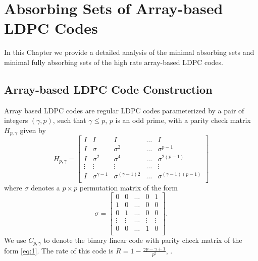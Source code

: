 \chapter[Absorbing Sets of Array-based LDPC Codes]{Absorbing Sets of Array-based LDPC
Codes}\label{arrayabs}

In this Chapter we provide a detailed analysis of the  minimal
absorbing sets and minimal fully absorbing sets of the high rate
array-based LDPC codes.


\section{Array-based LDPC Code Construction}




Array based LDPC codes \cite{fan} are regular LDPC codes
parameterized by a pair of integers $(\gamma, p)$, such that
$\gamma \leq p$, $p$ is an odd prime, with a parity check matrix
$H_{p,\gamma}$ given by
\begin{equation}\label{eq:1}
H_{p,\gamma}=\left[\begin{array}{ccccc}
I & I & I & \ldots & I\\
I & \sigma & \sigma^2 & \ldots &\sigma^{p-1}\\
I & \sigma^2 & \sigma^4 & \ldots &\sigma^{2(p-1)}\\
\vdots & \vdots & \vdots & \ldots & \vdots \\
I & \sigma^{\gamma-1} & \sigma^{(\gamma-1)2} & \ldots &\sigma^{(\gamma-1)(p-1)}\\
\end{array}
\right]
\end{equation}\normalsize
where $\sigma$ denotes a $p \times p$ permutation matrix of the
form \small
\begin{equation}
\sigma=\left[\begin{array}{ccccc}
0 & 0 & \ldots & 0 & 1\\
1 & 0 & \ldots & 0 & 0\\
0 & 1 & \ldots & 0 & 0\\
\vdots & \vdots & \ldots & \vdots & \vdots\\
0 & 0 & \ldots & 1 & 0\\
\end{array}
\right].
\end{equation}
\normalsize We use $C_{p,\gamma}$ to denote the binary linear code
with parity check matrix of the form \eqref{eq:1}. The rate of
this code is $R=1-\frac{\gamma p-\gamma+1}{p^2}$,
\cite{mittel:02}.

